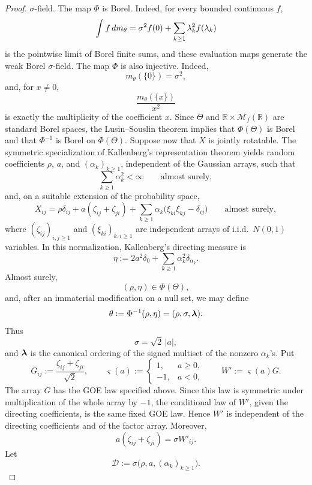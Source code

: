 \begin{proof}
\(\sigma\)-field. The map \(\Phi\) is Borel. Indeed, for every
bounded continuous \(f\),
\[
\int f\,dm_\theta
=
\sigma^2f(0)
+\sum_{k\geq1}\lambda_k^2f(\lambda_k)
\]
is the pointwise limit of Borel finite sums, and these evaluation
maps generate the weak Borel \(\sigma\)-field. The map \(\Phi\) is
also injective. Indeed,
\[
m_\theta(\{0\})=\sigma^2,
\]
and, for \(x\neq0\),
\[
\frac{m_\theta(\{x\})}{x^2}
\]
is exactly the multiplicity of the coefficient \(x\). Since
\(\Theta\) and
\(\mathbb R\times\mathcal M_f(\mathbb R)\) are standard Borel
spaces, the Lusin--Souslin theorem implies that
\(\Phi(\Theta)\) is Borel and that \(\Phi^{-1}\) is Borel on
\(\Phi(\Theta)\).
Suppose now that \(X\) is jointly rotatable. The symmetric
specialization of Kallenberg's representation theorem
\citep[Theorem~5.1 and equations~(17)--(18)]{kallenberg1988some} yields
random coefficients \(\rho\), \(a\), and
\((\alpha_k)_{k\geq1}\), independent of the Gaussian arrays, such
that
\[
\sum_{k\geq1}\alpha_k^2<\infty
\qquad\text{almost surely},
\]
and, on a suitable extension of the probability space,
\begin{equation}
\label{eq:kallenberg-symmetric}
X_{ij}
=
\rho\delta_{ij}
+a(\zeta_{ij}+\zeta_{ji})
+\sum_{k\geq1}
\alpha_k\bigl(\xi_{ki}\xi_{kj}-\delta_{ij}\bigr)
\qquad\text{almost surely},
\end{equation}
where \((\zeta_{ij})_{i,j\geq1}\) and
\((\xi_{ki})_{k,i\geq1}\) are independent arrays of i.i.d.\
\(N(0,1)\) variables.
In this normalization, Kallenberg's directing measure is
\[
\eta
:=
2a^2\delta_0
+\sum_{k\geq1}\alpha_k^2\delta_{\alpha_k}.
\]
Almost surely,
\[
(\rho,\eta)\in\Phi(\Theta),
\]
and, after an immaterial modification on a null set, we may define
\[
\theta
:=
\Phi^{-1}(\rho,\eta)
=
(\rho,\sigma,\bm{\lambda}).
\]
Thus
\[
\sigma=\sqrt2\,|a|,
\]
and \(\bm{\lambda}\) is the canonical ordering of the signed multiset of
the nonzero \(\alpha_k\)'s.
Put
\[
G_{ij}
:=
\frac{\zeta_{ij}+\zeta_{ji}}{\sqrt2},
\qquad
\varsigma(a)
:=
\begin{cases}
1,&a\geq0,\\
-1,&a<0,
\end{cases}
\qquad
W':=\varsigma(a)G.
\]
The array \(G\) has the GOE law specified above. Since this law is
symmetric under multiplication of the whole array by \(-1\), the
conditional law of \(W'\), given the directing coefficients, is the
same fixed GOE law. Hence \(W'\) is independent of the directing
coefficients and of the factor array. Moreover,
\[
a(\zeta_{ij}+\zeta_{ji})
=
\sigma W'_{ij}.
\]
Let
\[
\mathcal D
:=
\sigma\bigl(\rho,a,(\alpha_k)_{k\geq1}\bigr).
\]
\end{proof}
